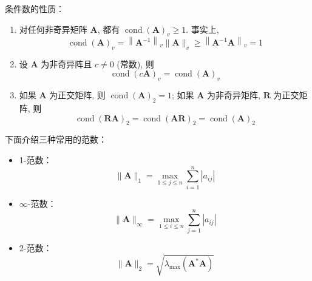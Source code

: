 \begin{property}
    条件数的性质：
    \begin{enumerate}
        \item 对任何非奇异矩阵 $\boldsymbol{A}$, 都有 $\operatorname{cond}(\boldsymbol{A})_v \geqslant 1$. 事实上,
              $$
                  \operatorname{cond}(\boldsymbol{A})_v=\left\|\boldsymbol{A}^{-1}\right\|_v\|\boldsymbol{A}\|_v \geqslant\left\|\boldsymbol{A}^{-1} \boldsymbol{A}\right\|_v=1
              $$
        \item 设 $\boldsymbol{A}$ 为非奇异阵且 $c \neq 0$ (常数), 则
              $$
                  \operatorname{cond}(c \boldsymbol{A})_v=\operatorname{cond}(\boldsymbol{A})_v
              $$
        \item 如果 $\boldsymbol{A}$ 为正交矩阵, 则 $\operatorname{cond}(\boldsymbol{A})_2=1$; 如果 $\boldsymbol{A}$ 为非奇异矩阵, $\boldsymbol{R}$ 为正交矩阵, 则
              $$
                  \operatorname{cond}(\boldsymbol{R} \boldsymbol{A})_2=\operatorname{cond}(\boldsymbol{A} \boldsymbol{R})_2=\operatorname{cond}(\boldsymbol{A})_2
              $$
    \end{enumerate}
\end{property}

下面介绍三种常用的范数：
\begin{itemize}
    \item 1-范数：
          \[
              \lVert \boldsymbol{A}\rVert_1=\max_{1\leqslant j\leqslant n}\sum_{i=1}^n|a_{ij}|
          \]
    \item $\infty$-范数：
          \[
              \lVert \boldsymbol{A}\rVert_\infty=\max_{1\leqslant i\leqslant n}\sum_{j=1}^n|a_{ij}|
          \]
    \item 2-范数：
          \[
              \lVert \boldsymbol{A}\rVert_2=\sqrt{\lambda_{\max}(\boldsymbol{A}^*\boldsymbol{A})}
          \]
\end{itemize}

